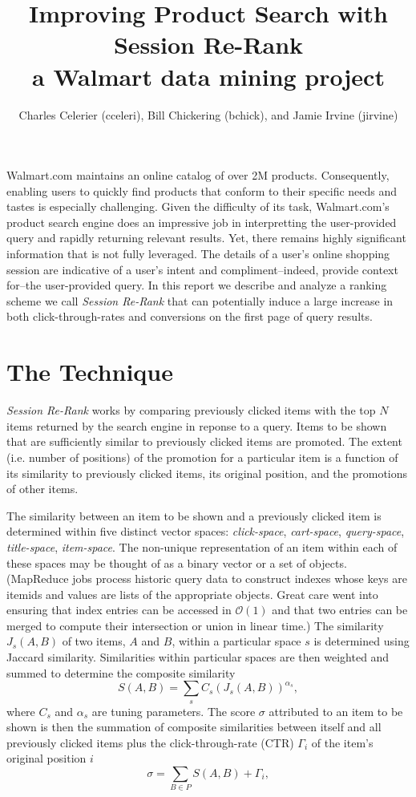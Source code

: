 \documentclass{article}
\title{Improving Product Search with Session Re-Rank\\
    \large{a Walmart data mining project}}
\author{Charles Celerier (cceleri), Bill Chickering (bchick),
        and Jamie Irvine (jirvine)}
\begin{document}
\maketitle

Walmart.com maintains an online catalog of over 2M products. Consequently,
enabling users to quickly find products that conform to their specific needs and
tastes is especially challenging. Given the difficulty of its task,
Walmart.com's product search engine does an impressive job in interpretting the
user-provided query and rapidly returning relevant results. Yet, there remains
highly significant information that is not fully leveraged. The details of a
user's online shopping session are indicative of a user's intent and
compliment--indeed, provide context for--the user-provided query. In this report
we describe and analyze a ranking scheme we call {\em Session Re-Rank} that can
potentially induce a large increase in both click-through-rates and conversions
on the first page of query results.

\section{The Technique}

{\em Session Re-Rank} works by comparing previously clicked items with the top
$N$ items returned by the search engine in reponse to a query. Items to be shown
that are sufficiently similar to previously clicked items are promoted. The
extent (i.e. number of positions) of the promotion for a particular item is a
function of its similarity to previously clicked items, its original position,
and the promotions of other items.

The similarity between an item to be shown and a previously clicked item is
determined within five distinct vector spaces: {\em click-space}, {\em
cart-space}, {\em query-space}, {\em title-space}, {\em item-space}. The
non-unique representation of an item within each of these spaces may be thought
of as a binary vector or a set of objects. (MapReduce jobs process historic
query data to construct indexes whose keys are itemids and values are lists of
the appropriate objects. Great care went into ensuring that index entries can be
accessed in $\mathcal{O}(1)$ and that two entries can be merged to compute their
intersection or union in linear time.) The similarity $J_s(A, B)$ of two items,
$A$ and $B$, within a particular space $s$ is determined using Jaccard
similarity. Similarities within particular spaces are then weighted and summed
to determine the composite similarity
\begin{equation*}
    S(A, B) = \sum_s{C_s(J_s(A, B))^{\alpha_s}},
\end{equation*}
where $C_s$ and $\alpha_s$ are tuning parameters. The score $\sigma$ attributed
to an item to be shown is then the summation of composite similarities between
itself and all previously clicked items plus the click-through-rate (CTR)
$\Gamma_i$ of the item's original position $i$
\begin{equation*}
    \sigma = \sum_{B \in P}{S(A, B)} + \Gamma_i,
\end{equation*}
\end{document}
